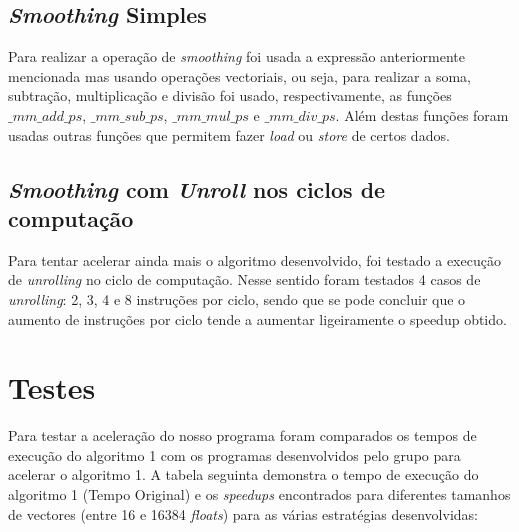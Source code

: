 \documentclass[a4paper]{article}
\begin{document}
	\subsection{\textit{Smoothing} Simples}
	
	Para realizar a operação de \textit{smoothing} foi usada a expressão anteriormente mencionada mas usando operações vectoriais, ou seja, para realizar a soma, subtração, multiplicação e divisão foi usado, respectivamente, as funções $\_mm\_add\_ps$, $\_mm\_sub\_ps$, $\_mm\_mul\_ps$ e $\_mm\_div\_ps$. Além destas funções foram usadas outras funções que permitem fazer \textit{load} ou \textit{store} de certos dados.
	
	\subsection{\textit{Smoothing} com \textit{Unroll} nos ciclos de computação}
	
	Para tentar acelerar ainda mais o algoritmo desenvolvido, foi testado a execução de \textit{unrolling} no ciclo de computação. Nesse sentido foram testados 4 casos de \textit{unrolling}: 2, 3, 4 e 8 instruções por ciclo, sendo que se pode concluir que o aumento de instruções por ciclo tende a aumentar ligeiramente o speedup obtido.
	
	
	\section{Testes} 
		
	Para testar a aceleração do nosso programa foram comparados os tempos de execução do algoritmo 1 com os programas desenvolvidos pelo grupo para acelerar o algoritmo 1. A tabela seguinta demonstra o tempo de execução do algoritmo 1 (Tempo Original) e os \textit{speedups} encontrados para diferentes tamanhos de vectores (entre 16 e 16384 \textit{floats}) para as várias estratégias desenvolvidas:
	
\end{document}
